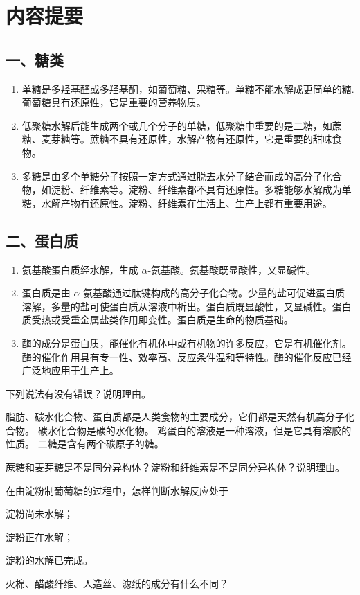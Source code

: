 \section*{内容提要}
\setcounter{subsection}{0}
\subsection*{一、糖类}
\begin{enumerate}[1.]
  \item 单糖是多羟基醛或多羟基酮，如葡萄糖、果糖等。单糖不能水解成更简单的糖. 葡萄糖具有还原性，它是重要的营养物质。
  \item 低聚糖水解后能生成两个或几个分子的单糖，低聚糖中重要的是二糖，如蔗糖、麦芽糖等。蔗糖不具有还原性，水解产物有还原性，它是重要的甜味食物。
  \item 多糖是由多个单糖分子按照一定方式通过脱去水分子结合而成的高分子化合物，如淀粉、纤维素等。淀粉、纤维素都不具有还原性。多糖能够水解成为单糖，水解产物有还原性。淀粉、纤维素在生活上、生产上都有重要用途。
\end{enumerate}
\subsection*{二、蛋白质}
\begin{enumerate}[1.]
  \item 氨基酸\quad 蛋白质经水解，生成 $\alpha$-氨基酸。氨基酸既显酸性，又显碱性。
  \item 蛋白质是由 $\alpha$-氨基酸通过肽键构成的高分子化合物。少量的盐可促进蛋白质溶解，多量的盐可使蛋白质从溶液中析出。蛋白质既显酸性，又显碱性。蛋白质受热或受重金属盐类作用即变性。蛋白质是生命的物质基础。
  \item 酶的成分是蛋白质，能催化有机体中或有机物的许多反应，它是有机催化剂。酶的催化作用具有专一性、效率高、反应条件温和等特性。酶的催化反应已经广泛地应用于生产上。
\end{enumerate}

\begin{Review}
\begin{question}
  \item 下列说法有没有错误？说明理由。
  \begin{tasks}[label=(\arabic*)]
    \task 脂肪、碳水化合物、蛋白质都是人类食物的主要成分，它们都是天然有机高分子化合物。
    \task 碳水化合物是碳的水化物。
    \task 鸡蛋白的溶液是一种溶液，但是它具有溶胶的性质。
    \task 二糖是含有两个碳原子的糖。
  \end{tasks}
  \item 蔗糖和麦芽糖是不是同分异构体？淀粉和纤维素是不是同分异构体？说明理由。
  \item 在由淀粉制葡萄糖的过程中，怎样判断水解反应处于
  \begin{enumerate*}[(1)]
    \item 淀粉尚未水解；
    \item 淀粉正在水解；
    \item 淀粉的水解已完成。
  \end{enumerate*}
  \item 火棉、醋酸纤维、人造丝、滤纸的成分有什么不同？
\end{question}
\end{Review}
